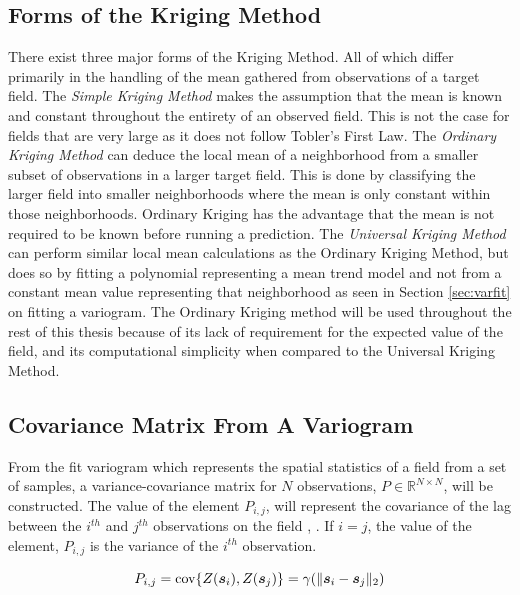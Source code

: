\subsection{Forms of the Kriging Method}
There exist three major forms of the Kriging Method. All of which differ primarily in the handling of the mean gathered from observations of a target field. The \textit{Simple Kriging Method} makes the assumption that the mean is known and constant throughout the entirety of an observed field. This is not the case for fields that are very large as it does not follow Tobler's First Law. The \textit{Ordinary Kriging Method} can deduce the local mean of a neighborhood from a smaller subset of observations in a larger target field. This is done by classifying the larger field into smaller neighborhoods where the mean is only constant within those neighborhoods. Ordinary Kriging has the advantage that the mean is not required to be known before running a prediction. The \textit{Universal Kriging Method} can perform similar local mean calculations as the Ordinary Kriging Method, but does so by fitting a polynomial representing a mean trend model and not from a constant mean value representing that neighborhood \cite{vandergraaf:nnkrig} as seen in Section \ref{sec:varfit} on fitting a variogram. The Ordinary Kriging method will be used throughout the rest of this thesis because of its lack of requirement for the expected value of the field, and its computational simplicity when compared to the Universal Kriging Method.

\subsection{Covariance Matrix From A Variogram} \label{sec:covmat}
From the fit variogram which represents the spatial statistics of a field from a set of samples, a variance-covariance matrix for $N$ observations, $P \in \mathbb{R}^{N \times N}$, will be constructed. The value of the element $P_{i,j}$, will represent the covariance of the lag between the $i^{th}$ and $j^{th}$ observations on the field \cite{goov:97}, \cite{matheron:geostat}. If $i=j$, the value of the element, $P_{i,j}$ is the variance of the $i^{th}$ observation. 

\begin{equation}
    P_{i,j} = \text{cov}\{Z({\it{\boldsymbol{s}}}_{i}), Z({\it{\boldsymbol{s}}}_{j})\} = \gamma(\| {\it{\boldsymbol{s}}}_i - {\it{\boldsymbol{s}}}_j \|_2)
    \label{eq:covvarmatelem}
\end{equation}

